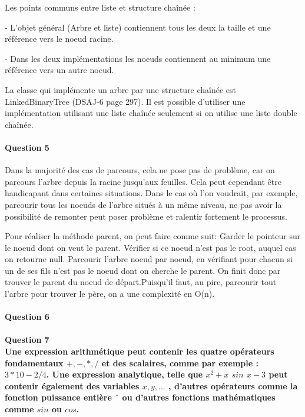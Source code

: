 \documentclass[a4paper]{article}
\begin{document}
Les points communs entre liste et structure chaînée :

- L’objet général (Arbre et liste) contiennent tous les deux la taille et une référence vers le noeud racine.

- Dans les deux implémentations les noeuds contiennent au minimum une référence vers un autre noeud.

La classe qui implémente un arbre par une structure chaînée est LinkedBinaryTree (DSAJ-6 page 297). Il est possible d’utiliser une implémentation utilisant une liste chaînée seulement si on utilise une liste double chaînée.

\paragraph{Question 5}

Dans la majorité des cas de parcours, cela ne pose pas de problème, car on parcours l'arbre depuis la racine jusqu'aux feuilles. Cela peut cependant être handicapant dans certaines situations. Dans le cas où l'on voudrait, par exemple, parcourir tous les noeuds de l'arbre situés à un même niveau, ne pas avoir la possibilité de remonter peut poser problème et ralentir fortement le processus.

Pour réaliser la méthode parent, on peut faire comme suit: Garder le pointeur sur le noeud dont on veut le parent.
Vérifier si ce noeud n'est pas le root, auquel cas on retourne null.
Parcourir l'arbre noeud par noeud, en vérifiant pour chacun si un de ses fils n'est pas le noeud dont on cherche le parent. 
On finit donc par trouver le parent du noeud de départ.Puisqu'il faut, au pire, parcourir tout l'arbre pour trouver le père, on a une complexité en O(n).

\paragraph{Question 6}

\paragraph{Question 7\\	Une expression arithmétique peut contenir les quatre opérateurs fondamentaux
	$ +,-,*,/ $ et des scalaires, comme par exemple : $ 3 * 10 - 2/4 $. Une expression
	analytique, telle que $ x^{2}+x$ $ sin $ $ x-3 $ peut contenir également des variables $ x,y,... $ ,
	d’autres opérateurs comme la fonction puissance entière $ ˆ $ ou d’autres fonctions
	mathématiques comme $ sin $ ou $ cos $.\\}
\end{document}
